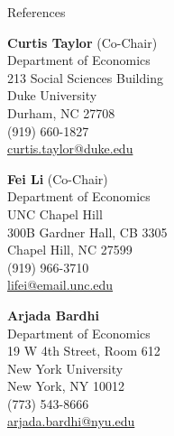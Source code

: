 \begin{rSection}{References}
	
	\medskip 
	
	\begin{minipage}{.31\linewidth}
		{\large \textbf{Curtis Taylor} (Co-Chair)}	\\[3pt]
		Department of Economics	\\		
		213 Social Sciences Building\\		
		Duke University\\		
		Durham, NC 27708\\[3pt]
		(919) 660-1827\\[3pt]
		\href{mailto:curtis.taylor@duke.edu}{curtis.taylor@duke.edu}
	\end{minipage}
	\hspace*{2pt}
	\begin{minipage}{.31\linewidth}
		{\large \textbf{Fei Li} (Co-Chair) }	\\[3pt]
		Department of Economics\\
		UNC Chapel Hill\\
		300B Gardner Hall, CB 3305\\
		Chapel Hill, NC 27599\\[3pt]
		(919) 966-3710\\[3pt]
		\href{mailto:lifei@email.unc.edu}{lifei@email.unc.edu}
	\end{minipage}
	\hspace*{2pt}
	\begin{minipage}{.31\linewidth}
		{\large \textbf{Arjada Bardhi}}	\\[3pt]
		Department of Economics	\\		
		19 W 4th Street, Room 612\\		
		New York University\\		
		New York, NY 10012\\[3pt]
		(773) 543-8666\\[3pt]
		\href{mailto:arjada.bardhi@nyu.edu}{arjada.bardhi@nyu.edu}
	\end{minipage}
\end{rSection}
	
